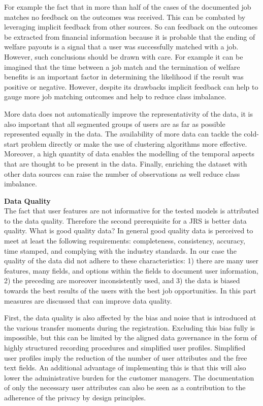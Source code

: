 For example the fact that in more than half of the cases of the documented job matches no feedback on the outcomes was received.
This can be combated by leveraging implicit feedback from other sources.
So can feedback on the outcomes be extracted from financial information because it is probable that the ending of welfare payouts is a signal that a user was successfully matched with a job. 
However, such conclusions should be drawn with care.
For example it can be imagined that the time between a job match and the termination of welfare benefits is an important factor in determining the likelihood if the result was positive or negative. 
However, despite its drawbacks implicit feedback can help to gauge more job matching outcomes and help to reduce class imbalance.

More data does not automatically improve the representativity of the data, it is also important that all segmented groups of users are as far as possible represented equally in the data.
The availability of more data can tackle the cold-start problem directly or make the use of clustering algorithms more effective. 
Moreover, a high quantity of data enables the modelling of the temporal aspects that are thought to be present in the data.
Finally, enriching the dataset with other data sources can raise the number of observations as well reduce class imbalance.

\noindent
\textbf{Data Quality}\\
The fact that user features are not informative for the tested models is attributed to the data quality. 
Therefore the second prerequisite for a JRS is better data quality.
What is good quality data?
In general good quality data is perceived to meet at least the following requirements: completeness, consistency, accuracy, time stamped, and complying with the industry standards. 
In our case the quality of the data did not adhere to these characteristics: 1) there are many user features, many fields, and options within the fields to document user information, 2) the preceding are moreover inconsistently used, and 3) the data is biased towards the best results of the users with the best job opportunities. 
In this part measures are discussed that can improve data quality.

First, the data quality is also affected by the bias and noise that is introduced at the various transfer moments during the registration.
Excluding this bias fully is impossible, but this can be limited by the aligned data governance in the form of highly structured recording procedures and simplified user profiles.
Simplified user profiles imply the reduction of the number of user attributes and the free text fields. 
An additional advantage of implementing this is that this will also lower the administrative burden for the customer managers.
The documentation of only the necessary user attributes can also be seen as a contribution to the adherence of the privacy by design principles. 

